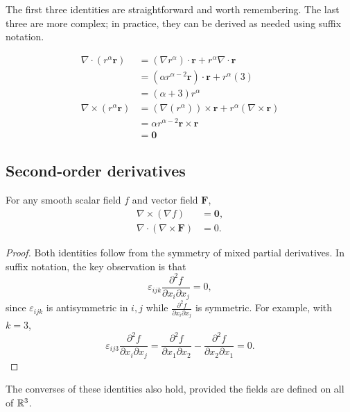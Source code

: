 \documentclass[a4paper]{article}
\begin{document}
\begin{rmk}
  The first three identities are straightforward and worth remembering. The last three are more complex; in practice, they can be derived as needed using suffix notation.
\end{rmk}
\begin{eg}
  \begin{align*}
    \nabla\cdot (r^\alpha \mathbf{r}) &= (\nabla r^\alpha)\cdot\mathbf{r} + r^\alpha \nabla\cdot \mathbf{r}\\
    &= (\alpha r^{\alpha - 2}\mathbf{r})\cdot \mathbf{r} + r^\alpha (3)\\
    &= (\alpha + 3)r^\alpha\\
    \nabla\times (r^\alpha \mathbf{r}) &= (\nabla(r^\alpha))\times \mathbf{r} + r^\alpha(\nabla\times \mathbf{r})\\
    &= \alpha r^{\alpha - 2} \mathbf{r}\times \mathbf{r}\\
    &= \mathbf{0}
  \end{align*}
\end{eg}

\subsection{Second-order derivatives}

\begin{prop}
  For any smooth scalar field $f$ and vector field $\mathbf{F}$,
  \begin{align*}
    \nabla\times (\nabla f) &= \mathbf{0},\\
    \nabla\cdot (\nabla\times \mathbf{F}) &= 0.
  \end{align*}
\end{prop}

\begin{proof}
  Both identities follow from the symmetry of mixed partial derivatives. In suffix notation, the key observation is that
  \[
    \varepsilon_{ijk}\frac{\partial^2 f}{\partial x_i \partial x_j} = 0,
  \]
  since $\varepsilon_{ijk}$ is antisymmetric in $i, j$ while $\frac{\partial^2 f}{\partial x_i \partial x_j}$ is symmetric. For example, with $k = 3$,
  \[
    \varepsilon_{ij3}\frac{\partial^2 f}{\partial x_i \partial x_j} = \frac{\partial^2 f}{\partial x_1 \partial x_2} - \frac{\partial^2 f}{\partial x_2 \partial x_1} = 0.
  \]
\end{proof}

\begin{rmk}
  The converses of these identities also hold, provided the fields are defined on all of $\mathbb{R}^3$.
\end{rmk}
\end{document}
